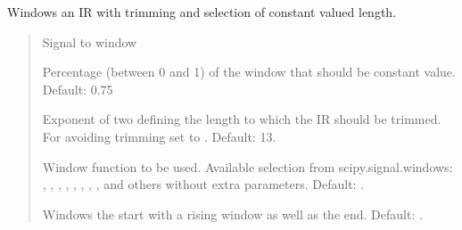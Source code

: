 \documentclass[letterpaper,10pt,english]{sphinxmanual}
\begin{document}
\begin{fulllineitems}
\label{\detokenize{modules/dsptools.transfer_functions:dsptools.transfer_functions.window_ir}}
\pysigstartsignatures
{}
\pysigstopsignatures
\sphinxAtStartPar
Windows an IR with trimming and selection of constant valued length.
\begin{quote}\begin{description}
\begin{description}
\sphinxAtStartPar
Signal to window

\sphinxAtStartPar
Percentage (between 0 and 1) of the window that should be
constant value. Default: 0.75

\sphinxAtStartPar
Exponent of two defining the length to which the IR should be
trimmed. For avoiding trimming set to . Default: 13.

\sphinxAtStartPar
Window function to be used. Available selection from
scipy.signal.windows: , , ,
, , , , ,  and
others without extra parameters. Default: .

\sphinxAtStartPar
Windows the start with a rising window as well as the end.
Default: .


\end{description}
\end{description}
\end{quote}
\end{fulllineitems}
\end{document}
